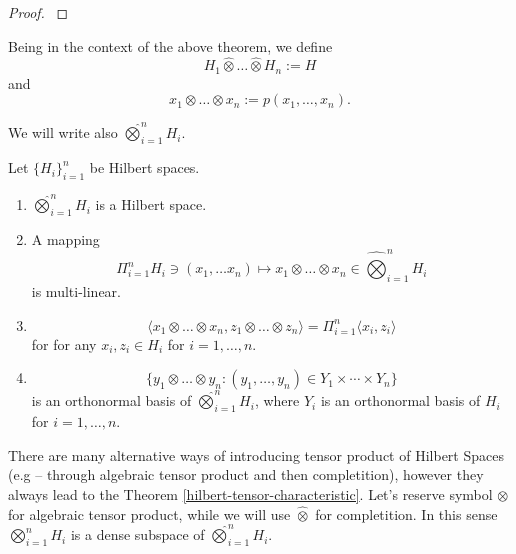 \documentclass[main.tex]{subfiles}
\begin{document}
\begin{proof}
\cite[see][2.6 Constructions with Hilbert Spaces]{kadison-ringrose1983_I}
\end{proof}
\begin{definition}
Being in the context of the above theorem, we define
\begin{equation}
H_1 \hat{\otimes} \dots \hat{\otimes} H_n := H
\end{equation}
and
\begin{equation}
x_1 \otimes \dots \otimes x_n := p(x_1, \dots, x_n).
\end{equation}
\end{definition}
We will write also $\hat{\bigotimes}_{i=1}^n H_i$.
\begin{theorem}
\label{hilbert-tensor-characteristic}
Let $\{H_i\}_{i=1}^n$ be Hilbert spaces.
\begin{enumerate}
\item $\hat{\bigotimes}_{i=1}^n H_i$ is a Hilbert space.
\item A mapping 
\begin{equation}
\Pi_{i=1}^n H_i \ni (x_1,\dots x_n)\mapsto x_1 \otimes \dots \otimes x_n \in \hat{\bigotimes}_{i=1}^n H_i
\end{equation}
is multi-linear.
\item
\begin{equation}
\langle x_1 \otimes \dots \otimes x_n, z_1 \otimes \dots \otimes z_n \rangle = \Pi_{i=1}^n\langle x_i, z_i \rangle
\end{equation}
for for any $x_i, z_i\in H_i$ for $i=1, \dots, n$.
\item
\begin{equation}
\{y_1 \otimes \dots \otimes y_n: (y_1,\dots, y_n)\in Y_1\times\cdots\times Y_n\}
\end{equation}
is an orthonormal basis of $\hat{\bigotimes}_{i=1}^n H_i$, where $Y_i$ is an orthonormal basis of $H_i$ for $i=1, \dots, n$.
\end{enumerate}
\end{theorem}
There are many alternative ways of introducing tensor product of Hilbert Spaces (e.g \cite[see][3.4 Tensor products of Hilbert spaces]{weidmann1980} -- through algebraic tensor product and then completition), however they always lead to the Theorem \ref{hilbert-tensor-characteristic}. Let's reserve symbol $\otimes$ for algebraic tensor product, while we will use $\hat{\otimes}$ for completition. In this sense $\bigotimes_{i=1}^n H_i$ is a dense subspace of $\hat{\bigotimes}_{i=1}^n H_i$.
\end{document}
